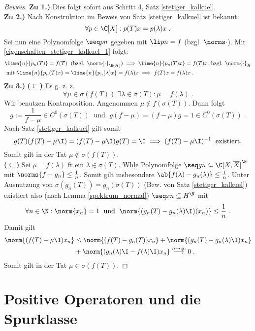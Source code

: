	\begin{proof}[Beweis]
		\textbf{Zu 1.)} Dies folgt sofort aus Schritt 4, Satz \ref{stetiger_kalkuel}.\\
		\textbf{Zu 2.)} Nach Konstruktion im Beweis von Satz \ref{stetiger_kalkuel} ist bekannt:
		\[\forall p \in \C[X]: p(T)x = p(\lambda)x\;.\]
		Sei nun eine Polynomfolge \(\seq pn\) gegeben mit \(\li pn = f\) (bzgl. \(\norms\cdot\)). Mit \ref{eigenschaften_stetiger_kalkuel_1} folgt:
		\begin{align*}
		&\lime{n}{p_n(T)} = f(T)\;\text{ (bzgl. $\norm{\cdot}_{\B(H)}$)} \implies \lime{n}{p_n(T)x} = f(T)x \;\text{ bzgl. $\norm{\cdot}_{H}$} \\
		& \text{ mit }\lime{n}{p_n(T)x} = \lime{n}{p_n(\lambda)x} = f(\lambda)x \implies f(T)x = f(\lambda)x\;.
		\end{align*}
		\textbf{Zu 3.)} \textbf{($\subseteq$)} Es g. z. z. 
		\[\forall \mu \in \sigma(f(T)) \;\exists \lambda \in \sigma(T): \mu = f(\lambda)\;.\]
		Wir benutzen Kontraposition. Angenommen \(\mu \not\in f(\sigma(T))\). Dann folgt
		\[g := \frac{1}{f-\mu} \in C^0(\sigma(T)) \;\text{ und }\; g(f-\mu) = (f-\mu)g = 1 \in C^0(\sigma(T))\;.\]
		Nach Satz \ref{stetiger_kalkuel} gilt somit
		\[g(T)(f(T) -\mu\I) = (f(T) -\mu\I)g(T) = \I \implies (f(T) -\mu\I)^{-1}\;\text{ existiert.}\]
		Somit gilt in der Tat \(\mu\not\in \sigma(f(T))\).\\
		\textbf{($\subseteq$)} Sei \(\mu = f(\lambda)\) f\us r ein \(\lambda \in \sigma(T)\). W\as hle Polynomfolge \(\seq gn \subseteq \C[X,\overline X]^\N\) mit \(\norms{f - g_n} \leq \frac1n\). Somit gilt insbesondere \(\ab{f(\lambda) - g_n(\lambda)} \leq \frac 1n\). Unter Ausnutzung von \(\sigma(g_n(T)) = g_n(\sigma(T))\) (Bew. von Satz \ref{stetiger_kalkuel}) existiert also (nach Lemma \ref{spektrum_normal}) \(\seq xn \subseteq H^\N\) mit 
		\[\forall n\in\N: \norm{x_n} = 1 \;\text{ und } \; \norm{(g_n(T) - g_n(\lambda)\I)(x_n)}\leq \frac 1n\;.\]
		Damit gilt
		\begin{align*}
			\norm{(f(T) -\mu\I) x_n} &\leq \norm{(f(T) - g_n(T))x_n} + \norm{(g_n(T) - g_n(\lambda)\I)x_n} \\
			&+ \norm{(g_n(\lambda)\I - f(\lambda)\I)x_n} \overset{n\to\infty}{\longrightarrow} 0\;.
			\end{align*}
			Somit gilt in der Tat \(\mu\in\sigma(f(T))\).
	\end{proof}
	
	\section{Positive Operatoren und die Spurklasse}
	
